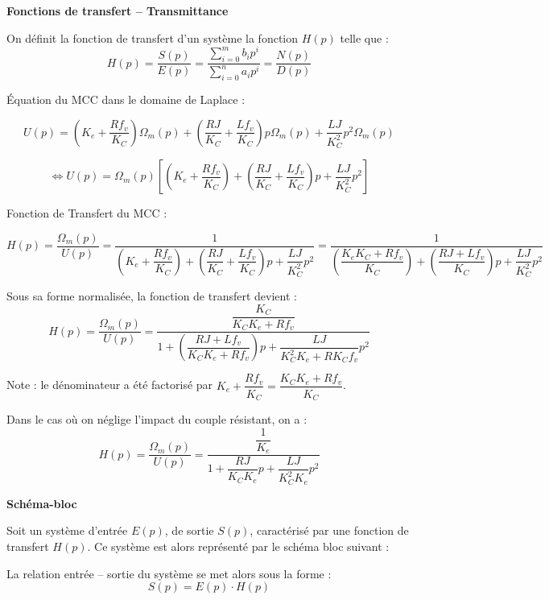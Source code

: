 \documentclass[10pt,fleqn]{article} %
\begin{document}
\begin{defi}
 \textbf{Fonctions de transfert -- Transmittance}

On définit la fonction de transfert d'un système la fonction $H(p)$ telle que :
$$
H(p)
=\dfrac{S(p)}{E(p)} 
= \dfrac{\sum\limits_{i=0}^{m} b_i p^i}{\sum\limits_{i=0}^{n} a_i p^i}
=\dfrac{N(p)}{D(p)} 
$$
\end{defi}


\begin{exemple}
Équation du MCC dans le domaine de Laplace :

$$
U(p)= 
 \left( K_e + \dfrac{R f_v}{K_C}\right) \Omega_m(p)
+\left( \dfrac{RJ}{K_C} + \dfrac{Lf_v}{K_C} \right) p \Omega_m(p)
+\dfrac{LJ}{K_C^2}  p^2 \Omega_m(p)
$$

$$ \Longleftrightarrow
U(p)= \Omega_m(p) \left[ 
 \left( K_e + \dfrac{R f_v}{K_C}\right) 
+\left( \dfrac{RJ}{K_C} + \dfrac{Lf_v}{K_C} \right) p 
+\dfrac{LJ}{K_C^2}  p^2 
\right]
$$


Fonction de Transfert du MCC :

$$
H(p)=\dfrac{\Omega_m(p)}{U(p)}
=\dfrac{1}{ \left( K_e + \dfrac{R f_v}{K_C}\right) 
+\left( \dfrac{RJ}{K_C} + \dfrac{Lf_v}{K_C} \right) p 
+\dfrac{LJ}{K_C^2}  p^2 }
=\dfrac{1}{ \left(  \dfrac{K_e K_C +R f_v}{K_C}\right) 
+\left( \dfrac{RJ+Lf_v}{K_C} \right) p 
+\dfrac{LJ}{K_C^2}  p^2 }
$$

Sous sa forme normalisée, la fonction de transfert devient : 
$$
H(p)=\dfrac{\Omega_m(p)}{U(p)}
=\dfrac{\dfrac{K_C}{K_C K_e + R f_v}}{ 1
+\left( \dfrac{RJ + Lf_v}{K_C K_e + R f_v} \right) p 
+\dfrac{LJ}{ K_C^2 K_e + RK_C f_v}  p^2 }
$$

Note : le dénominateur a été factorisé par $K_e + \dfrac{R f_v}{K_C} = \dfrac{K_C K_e + R f_v}{K_C} $.



Dans le cas où on néglige l'impact du couple résistant, on a :
$$
H(p)=\dfrac{\Omega_m(p)}{U(p)}
=\dfrac{
\dfrac{1}{K_e}}{ 1
+ \dfrac{RJ}{K_C K_e } p 
+\dfrac{LJ}{ K_C^2 K_e }  
p^2 }
$$

\end{exemple}

\begin{defi}
 \textbf{Schéma-bloc}

Soit un système d'entrée $E(p)$, de sortie $S(p)$, caractérisé par une fonction
de transfert $H(p)$. Ce système est alors représenté par le schéma bloc suivant
: 
\begin{center}
\end{center}

La relation entrée -- sortie du système se met alors sous la forme : 
$$
S(p) = E(p) \cdot H(p)
$$
\end{defi}
\end{document}
